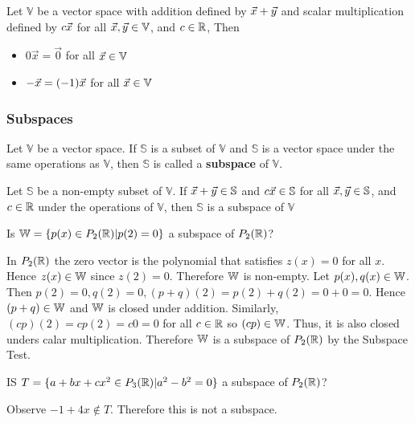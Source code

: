 \documentclass[english, 12pt]{article}
\begin{document}
\begin{thrm}
Let $\mathbb{V}$ be a vector space with addition defined by $\vec{x} + \vec{y}$ and scalar multiplication defined by $c \vec{x}$ for all $\vec{x},\vec{y} \in \mathbb{V}$, and $c \in {\mathbb{R}}$, Then
\begin{itemize}
\item $0 \vec{x} = \vec{0}$ for all $\vec{x} \in \mathbb{V}$
\item $- \vec{x} = (-1)\vec{x}$ for all $\vec{x} \in \mathbb{V}$
\end{itemize}
\end{thrm}

\subsubsection{Subspaces}

\begin{defn}
Let $\mathbb{V}$ be a vector space. If $\mathbb{S}$ is a subset of $\mathbb{V}$ and $\mathbb{S}$ is a vector space under the same operations as $\mathbb{V}$, then $\mathbb{S}$ is called a \textbf{subspace} of $\mathbb{V}$.
\end{defn}

\begin{thrm}
Let $\mathbb{S}$ be a non-empty subset of $\mathbb{V}$. If $\vec{x} + \vec{y} \in \mathbb{S}$ and $c\vec{x} \in \mathbb{S}$ for all $\vec{x},\vec{y} \in \mathbb{S}$, and $c \in {\mathbb{R}}$ under the operations of $\mathbb{V}$, then $\mathbb{S}$ is a subspace of $\mathbb{V}$
\end{thrm}

\begin{exmp}
Is ${\mathbb{W}} = \{p(x) \in P_2({\mathbb{R}})|p(2) = 0\}$ a subspace of $P_2({\mathbb{R}})$?
\begin{sol}
In $P_2({\mathbb{R}})$ the zero vector is the polynomial that satisfies $z(x) = 0$ for all $x$. Hence $z(x) \in {\mathbb{W}}$ since $z(2) = 0$. Therefore ${\mathbb{W}}$ is non-empty.\n
Let $p(x),q(x) \in {\mathbb{W}}$. Then $p(2) = 0, q(2) = 0, (p+q)(2) = p(2) + q(2) = 0 + 0 = 0$. Hence $(p+q) \in {\mathbb{W}}$ and ${\mathbb{W}}$ is closed under addition.\n
Similarly, $(cp)(2) = cp(2) = c0 = 0$ for all $c \in {\mathbb{R}}$ so $(cp) \in {\mathbb{W}}$. Thus, it is also closed unders calar multiplication. Therefore ${\mathbb{W}}$ is a subspace of $P_2({\mathbb{R}})$ by the Subspace Test.
\end{sol}
\end{exmp}

\begin{exmp}
IS $T = \{a + bx + cx^2 \in P_3({\mathbb{R}})|a^2 - b^2 = 0\}$ a subspace of $P_2({\mathbb{R}})$?
\begin{sol}
Observe $-1 + 4x \not\in T$. Therefore this is not a subspace.
\end{sol}
\end{exmp}
\end{document}
